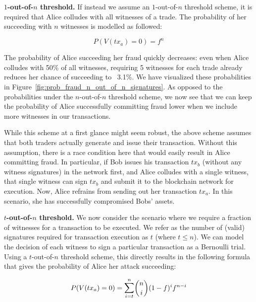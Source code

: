 \documentclass{article}
\begin{document}
\textbf{$1$-out-of-$n$ threshold.}
If instead we assume an $1$-out-of-$n$ threshold scheme, it is required that Alice colludes with all witnesses of a trade.
The probability of her succeeding with $ n $ witnesses is modelled as followed:

\begin{equation}
	P(V(tx_a) = 0) = f^n
\end{equation}

The probability of Alice succeeding her fraud quickly decreases: even when Alice colludes with 50\% of all witnesses, requiring 5 witnesses for each trade already reduces her chance of succeeding to ~3.1\%.
We have visualized these probabilities in Figure~\ref{fig:prob_fraud_n_out_of_n_signatures}.
As opposed to the probabilities under the $n$-out-of-$n$ threshold scheme, we now see that we can keep the probability of Alice successfully committing fraud lower when we include more witnesses in our transactions.

While this scheme at a first glance might seem robust, the above scheme assumes that both traders actually generate and issue their transaction.
Without this assumption, there is a race condition here that would easily result in Alice committing fraud.
In particular, if Bob issues his transaction $tx_b$ (without any witness signatures) in the network first, and Alice colludes with a single witness, that single witness can sign $ tx_b $ and submit it to the blockchain network for execution.
Now, Alice refrains from sending out her transaction $tx_a$.
In this scenario, she has successfully compromised Bobs' assets.

\textbf{$t$-out-of-$n$ threshold.}
We now consider the scenario where we require a fraction of witnesses for a transaction to be executed.
We refer as the number of (valid) signatures required for transaction execution as $ t $ (where $ t \leq n $).
We can model the decision of each witness to sign a particular transaction as a Bernoulli trial.
Using a $t$-out-of-$n$ threshold scheme, this directly results in the following formula that gives the probability of Alice her attack succeeding:

\begin{equation}
	P(V(tx_a) = 0) = \mathlarger{\sum}_{i=t}^n {n \choose i} (1-f)^i f^{n-i}
\end{equation}

\end{document}
